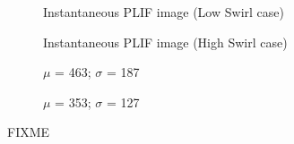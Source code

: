 \begin{figure}

\centering

\hfill
\begin{subfigure}{0.45\linewidth}
  \centering
  
  \caption{Instantaneous PLIF image (Low Swirl case)}
  \label{fig:referenceVelocityLowVelPLIFImage}
\end{subfigure}
\hfill
\begin{subfigure}{0.45\linewidth}
  \centering
  
  \caption{Instantaneous PLIF image (High Swirl case)}
  \label{fig:highEquivalenceRatioPLIFImage}
\end{subfigure}
\hfill

\hfill
\begin{subfigure}{0.45\linewidth}
  \centering
  
  \caption{\(\mu\) = 463; \(\sigma\) = 187}
  \label{fig:referenceVelocityLowVelPLIFHistogram}
\end{subfigure}
\hfill
\begin{subfigure}{0.45\linewidth}
  \centering
  
  \caption{\(\mu\) = 353; \(\sigma\) = 127}
  \label{fig:highEquivalenceRatioPLIFHistogram}
\end{subfigure}
\hfill

\caption[Effect of Equivalence Ratio on Flame Structure]{FIXME}

\label{fig:equivalenceRatioPLIFResults}

\end{figure}

